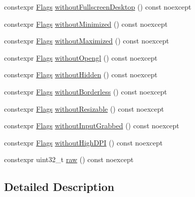 \begin{DoxyCompactItemize}
constexpr \mbox{\hyperlink{structrolmodl_1_1win_1_1_flags}{Flags}} \mbox{\hyperlink{structrolmodl_1_1win_1_1_flags_a06abd3a91f86493f49e83fdedc3d55c7}{without\+Fullscreen\+Desktop}} () const noexcept
\item 
constexpr \mbox{\hyperlink{structrolmodl_1_1win_1_1_flags}{Flags}} \mbox{\hyperlink{structrolmodl_1_1win_1_1_flags_a1e07730bc3ce4d799f53233fe706686b}{without\+Minimized}} () const noexcept
\item 
constexpr \mbox{\hyperlink{structrolmodl_1_1win_1_1_flags}{Flags}} \mbox{\hyperlink{structrolmodl_1_1win_1_1_flags_a5abe47926362ee129a2c5e0c1efc70fc}{without\+Maximized}} () const noexcept
\item 
constexpr \mbox{\hyperlink{structrolmodl_1_1win_1_1_flags}{Flags}} \mbox{\hyperlink{structrolmodl_1_1win_1_1_flags_a238e221a7957b8962a7030642a170038}{without\+Opengl}} () const noexcept
\item 
constexpr \mbox{\hyperlink{structrolmodl_1_1win_1_1_flags}{Flags}} \mbox{\hyperlink{structrolmodl_1_1win_1_1_flags_a7ef39f2d0a29490101191fb93b26c8f2}{without\+Hidden}} () const noexcept
\item 
constexpr \mbox{\hyperlink{structrolmodl_1_1win_1_1_flags}{Flags}} \mbox{\hyperlink{structrolmodl_1_1win_1_1_flags_a2440e1681f7ab485a59c7838cf0f4468}{without\+Borderless}} () const noexcept
\item 
constexpr \mbox{\hyperlink{structrolmodl_1_1win_1_1_flags}{Flags}} \mbox{\hyperlink{structrolmodl_1_1win_1_1_flags_af3c61a6ab9a8cc06e08b328d13782544}{without\+Resizable}} () const noexcept
\item 
constexpr \mbox{\hyperlink{structrolmodl_1_1win_1_1_flags}{Flags}} \mbox{\hyperlink{structrolmodl_1_1win_1_1_flags_a2e21e22deaf66fbd81b3f447df8f5668}{without\+Input\+Grabbed}} () const noexcept
\item 
constexpr \mbox{\hyperlink{structrolmodl_1_1win_1_1_flags}{Flags}} \mbox{\hyperlink{structrolmodl_1_1win_1_1_flags_a5e37049ff79f3c4cfca9a08fb1818c66}{without\+High\+D\+PI}} () const noexcept
\item 
constexpr uint32\+\_\+t \mbox{\hyperlink{structrolmodl_1_1win_1_1_flags_a6e3024e05b08cb7c2659e43e730431ac}{raw}} () const noexcept
\end{DoxyCompactItemize}


\subsection{Detailed Description}


